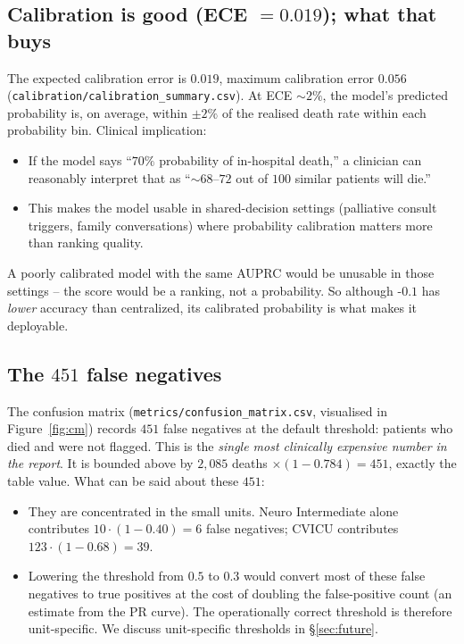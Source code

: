 \subsection{Calibration is good (ECE $=0.019$); what that buys}
The expected calibration error is $0.019$, maximum calibration error $0.056$
(\texttt{calibration/calibration\_summary.csv}). At ECE $\sim 2\%$, the
model's predicted probability is, on average, within $\pm 2\%$ of the realised
death rate within each probability bin. Clinical implication:
\begin{itemize}[leftmargin=*,nosep]
    \item If the model says ``$70\%$ probability of in-hospital death,'' a
        clinician can reasonably interpret that as ``$\sim 68$--$72$
        out of $100$ similar patients will die.''
    \item This makes the model usable in shared-decision settings (palliative
        consult triggers, family conversations) where probability calibration
        matters more than ranking quality.
\end{itemize}
A poorly calibrated model with the same AUPRC would be unusable in those
settings -- the score would be a ranking, not a probability. So although
\fedprox{}-$0.1$ has \emph{lower} accuracy than centralized, its calibrated
probability is what makes it deployable.

\subsection{The $451$ false negatives}
The confusion matrix (\texttt{metrics/confusion\_matrix.csv}, visualised in
Figure~\ref{fig:cm}) records $451$ false negatives at the default threshold:
patients who died and were not flagged. This is the
\emph{single most clinically expensive number in the report}. It is bounded
above by $2{,}085$ deaths $\times (1 - 0.784) = 451$, exactly the table value.
What can be said about these $451$:
\begin{itemize}[leftmargin=*,nosep]
    \item They are concentrated in the small units. Neuro Intermediate alone
        contributes $10\!\cdot\!(1\!-\!0.40) = 6$ false negatives; CVICU
        contributes $123\!\cdot\!(1\!-\!0.68) = 39$.
    \item Lowering the threshold from $0.5$ to $0.3$ would convert most of
        these false negatives to true positives at the cost of doubling the
        false-positive count (an estimate from the PR curve). The
        operationally correct threshold is therefore unit-specific. We discuss
        unit-specific thresholds in \S\ref{sec:future}.
\end{itemize}

